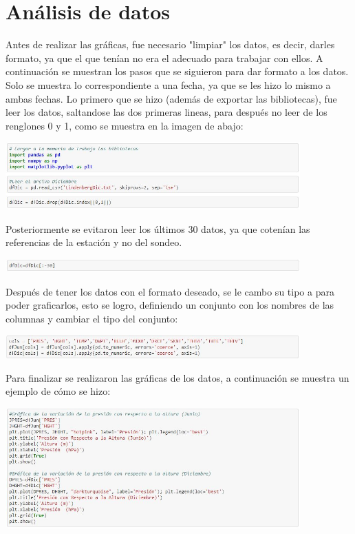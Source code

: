\documentclass{article}
\begin{document}
\section{Análisis de datos}
Antes de realizar las gráficas, fue necesario "limpiar" los datos, es decir, darles formato, ya que el que tenían no era el adecuado para trabajar con ellos. 
A continuación se muestran los pasos que se siguieron para dar formato a los datos. Solo se muestra lo correspondiente a una fecha, ya que se les hizo lo mismo a ambas fechas.
Lo primero que se hizo (además de exportar las bibliotecas), fue leer los datos, saltandose las dos primeras lineas, para después no leer de los renglones 0 y 1, como se muestra en la imagen de abajo:

\begin{center}
    \includegraphics[width=0.85\textwidth]{LeerDatos.JPG}
\end{center}

Posteriormente se evitaron leer los últimos 30 datos, ya que cotenían las referencias de la estación y no del sondeo.
\begin{center}
  \includegraphics[width=0.85\textwidth]{BorrarDatos.JPG}
\end{center}
Después de tener los datos con el formato deseado, se le cambo su tipo a para poder graficarlos, esto se logro, definiendo un conjunto con los nombres de las columnas y cambiar el tipo del conjunto:
\begin{center}
  \includegraphics[width=0.85\textwidth]{Objeto.JPG}
\end{center}

Para finalizar se realizaron las gráficas de los datos, a continuación se muestra un ejemplo de cómo se hizo:
\begin{center}
  \includegraphics[width=0.85\textwidth]{Grafica.JPG}
\end{center}
\end{document}
